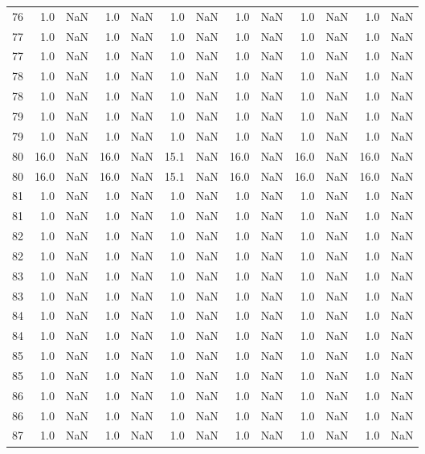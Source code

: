 \begin{tabular}{lrrrrrrrrrrrr}
76 & 1.0 & NaN & 1.0 & NaN & 1.0 & NaN & 1.0 & NaN & 1.0 & NaN & 1.0 & NaN \\
77 & 1.0 & NaN & 1.0 & NaN & 1.0 & NaN & 1.0 & NaN & 1.0 & NaN & 1.0 & NaN \\
77 & 1.0 & NaN & 1.0 & NaN & 1.0 & NaN & 1.0 & NaN & 1.0 & NaN & 1.0 & NaN \\
78 & 1.0 & NaN & 1.0 & NaN & 1.0 & NaN & 1.0 & NaN & 1.0 & NaN & 1.0 & NaN \\
78 & 1.0 & NaN & 1.0 & NaN & 1.0 & NaN & 1.0 & NaN & 1.0 & NaN & 1.0 & NaN \\
79 & 1.0 & NaN & 1.0 & NaN & 1.0 & NaN & 1.0 & NaN & 1.0 & NaN & 1.0 & NaN \\
79 & 1.0 & NaN & 1.0 & NaN & 1.0 & NaN & 1.0 & NaN & 1.0 & NaN & 1.0 & NaN \\
80 & 16.0 & NaN & 16.0 & NaN & 15.1 & NaN & 16.0 & NaN & 16.0 & NaN & 16.0 & NaN \\
80 & 16.0 & NaN & 16.0 & NaN & 15.1 & NaN & 16.0 & NaN & 16.0 & NaN & 16.0 & NaN \\
81 & 1.0 & NaN & 1.0 & NaN & 1.0 & NaN & 1.0 & NaN & 1.0 & NaN & 1.0 & NaN \\
81 & 1.0 & NaN & 1.0 & NaN & 1.0 & NaN & 1.0 & NaN & 1.0 & NaN & 1.0 & NaN \\
82 & 1.0 & NaN & 1.0 & NaN & 1.0 & NaN & 1.0 & NaN & 1.0 & NaN & 1.0 & NaN \\
82 & 1.0 & NaN & 1.0 & NaN & 1.0 & NaN & 1.0 & NaN & 1.0 & NaN & 1.0 & NaN \\
83 & 1.0 & NaN & 1.0 & NaN & 1.0 & NaN & 1.0 & NaN & 1.0 & NaN & 1.0 & NaN \\
83 & 1.0 & NaN & 1.0 & NaN & 1.0 & NaN & 1.0 & NaN & 1.0 & NaN & 1.0 & NaN \\
84 & 1.0 & NaN & 1.0 & NaN & 1.0 & NaN & 1.0 & NaN & 1.0 & NaN & 1.0 & NaN \\
84 & 1.0 & NaN & 1.0 & NaN & 1.0 & NaN & 1.0 & NaN & 1.0 & NaN & 1.0 & NaN \\
85 & 1.0 & NaN & 1.0 & NaN & 1.0 & NaN & 1.0 & NaN & 1.0 & NaN & 1.0 & NaN \\
85 & 1.0 & NaN & 1.0 & NaN & 1.0 & NaN & 1.0 & NaN & 1.0 & NaN & 1.0 & NaN \\
86 & 1.0 & NaN & 1.0 & NaN & 1.0 & NaN & 1.0 & NaN & 1.0 & NaN & 1.0 & NaN \\
86 & 1.0 & NaN & 1.0 & NaN & 1.0 & NaN & 1.0 & NaN & 1.0 & NaN & 1.0 & NaN \\
87 & 1.0 & NaN & 1.0 & NaN & 1.0 & NaN & 1.0 & NaN & 1.0 & NaN & 1.0 & NaN \\

\end{tabular}
